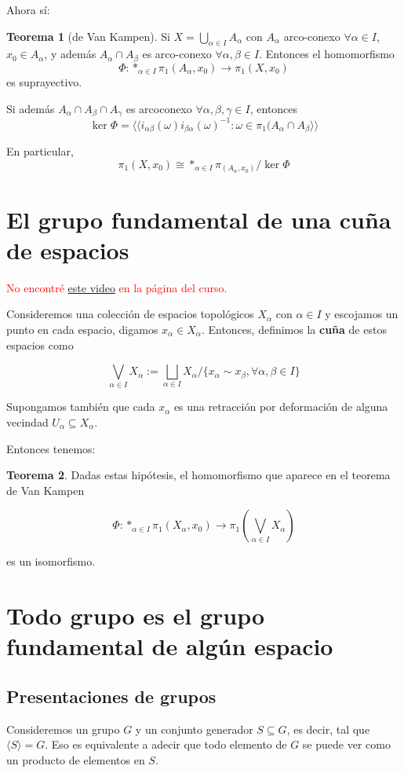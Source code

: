 \documentclass[spanish]{book}
\theoremstyle{definition}
\newtheorem*{teo}{Teorema}
\begin{document}
	Ahora sí:
	
	\begin{teo}[de Van Kampen]
		Si $X=\bigcup_{\alpha\in I}A_\alpha$ con $A_\alpha$ arco-conexo $\forall\alpha\in I$, $x_0\in A_\alpha$, y además $A_\alpha\cap A_\beta$ es arco-conexo $\forall\alpha,\beta\in I$. Entonces el homomorfismo
		\[\Phi:\ast_{\alpha\in I}\pi_1(A_\alpha,x_0)\to\pi_1(X,x_0)\]
		es suprayectivo.
		
		Si además $A_\alpha\cap A_\beta\cap A_\gamma$ es arcoconexo $\forall\alpha,\beta,\gamma\in I$, entonces
		\[\ker\Phi=\langle\langle i_{\alpha\beta}(\omega)i_{\beta\alpha}(\omega)^{-1}:\omega\in\pi_1(A_\alpha\cap A_\beta\rangle\rangle\]
		
		En particular,\[\pi_1(X,x_0)\cong \ast_{\alpha\in I}\pi_(A_\alpha,x_0)/\ker\Phi\]
	\end{teo}
	
\section{El grupo fundamental de una cuña de espacios}
		\textcolor{red}{No encontré \href{https://www.youtube.com/watch?v=9P6n__Njlz8}{este video} en la página del curso.}
		
		Consideremos una colección de espacios topológicos $X_\alpha$ con $\alpha\in I$ y escojamos un punto en cada espacio, digamos $x_\alpha\in X_\alpha$. Entonces, definimos la \textbf{cuña} de estos espacios como
		
		\[\bigvee_{\alpha\in I}X_\alpha:=\bigsqcup_{\alpha\in I}X_\alpha\Big/\{x_\alpha\sim{}x_\beta,\forall\alpha,\beta\in I\}\]
		
		Supongamos también que cada $x_\alpha$ es una retracción por deformación de alguna vecindad $U_\alpha\subseteq X_\alpha$.
		
		Entonces tenemos:
		
		\begin{teo}
			Dadas estas hipótesis, el homomorfismo que aparece en el teorema de Van Kampen
			
			\[\Phi:\ast_{\alpha\in I}\pi_1(X_\alpha,x_0)\to \pi_1(\bigvee_{\alpha\in I}X_\alpha)\]
			
			es un isomorfismo.
		\end{teo}

\section{Todo grupo es el grupo fundamental de algún espacio}
\subsection{Presentaciones de grupos}
	Consideremos un grupo $G$ y un conjunto generador $S\subseteq G$, es decir, tal que $\langle S\rangle=G$. Eso es equivalente a adecir que todo elemento de $G$ se puede ver como un producto de elementos en $S$.
	
\end{document}
